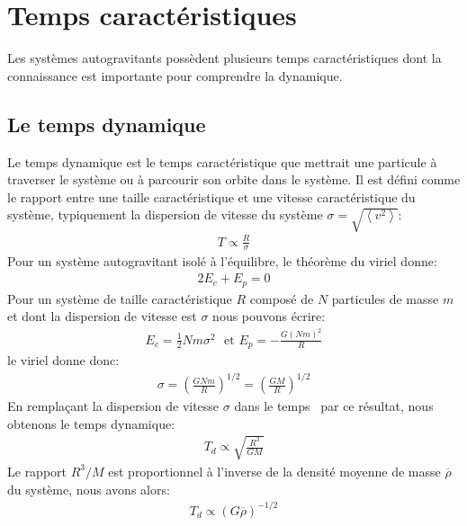 \section{Temps caractéristiques\label{chap_trelax}}

Les systèmes autogravitants possèdent plusieurs temps caractéristiques dont la connaissance est importante pour comprendre la dynamique.

\subsection{Le temps dynamique}

Le temps dynamique est le temps caractéristique que mettrait une particule à traverser le système ou à parcourir son orbite dans le système. Il est
défini comme le rapport entre une taille caractéristique et une vitesse caractéristique du système, typiquement la dispersion de vitesse du système
$\sigma=\sqrt{\left\langle v^2\right\rangle}$:
\begin{align}
	T\propto\frac{R}{\sigma} \label{Eq::TempsCarac::Tcr}
\end{align}
Pour un système autogravitant isolé à l'équilibre, le théorème du viriel donne:
\begin{align*}
	2E_{c}+E_{p}=0
\end{align*}
Pour un système de taille caractéristique $R$ composé de $N$ particules de masse $m$ et dont la dispersion de vitesse est $\sigma$ nous pouvons écrire:
\begin{align*}
	E_{c}=\frac{1}{2}Nm\sigma^{2}\ \ \ \text{et\ \ \ }E_{p}=-\frac{G\left(Nm\right)^{2}}{R}%
\end{align*}
le viriel donne donc:
\begin{align*}
	\sigma=\left(  \frac{GNm}{R}\right)  ^{1/2}=\left(  \frac{GM}{R}\right) ^{1/2}%
\end{align*}
En remplaçant la dispersion de vitesse $\sigma$ dans le temps~ par ce résultat, nous obtenons le temps dynamique:
\begin{align*}
	T_{d}\propto\sqrt{\frac{R^{3}}{GM}}%
\end{align*}
Le rapport $R^{3}/M$ est proportionnel à l'inverse de la densité moyenne de masse $\overline{\rho}$ du système, nous avons alors:
\begin{align}
	T_{d}\propto\left(  G\overline{\rho}\right)  ^{-1/2} \label{def:T-dyn_tcr} %
\end{align}

